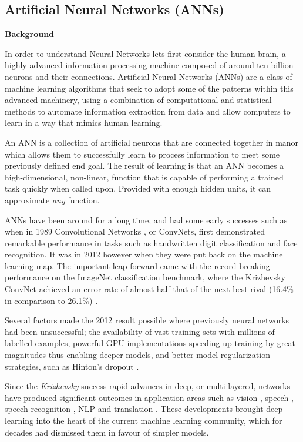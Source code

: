 \documentclass[a4paper,11pt,titlepage]{article}
\begin{document}
	\subsection{Artificial Neural Networks (ANNs)}	
		\textbf{Background} 
		\par
			In order to understand Neural Networks lets first consider the human brain, a highly advanced information processing machine composed of around ten billion neurons and their connections. Artificial Neural Networks (ANNs) are a class of machine learning algorithms that seek to adopt some of the patterns within this advanced machinery, using a combination of computational and statistical methods to automate information extraction from data and allow computers to learn in a way that mimics human learning.
			\par 
			An ANN is a collection of artificial neurons that are connected together in manor which allows them to successfully learn to process information to meet some previously defined end goal. The result of learning is that an ANN becomes a high-dimensional, non-linear, function that is capable of performing a trained task quickly when called upon. Provided with enough hidden units, it can approximate \textit{any} function. 
			\par
			ANNs have been around for a long time, and had some early successes such as when in 1989 Convolutional Networks \cite{LeCun1989}, or ConvNets, first demonstrated remarkable performance in tasks such as handwritten digit classification and face recognition. It was in 2012 however when they were put back on the machine learning map. The important leap forward came with the record breaking performance on the ImageNet classification benchmark, where the Krizhevsky ConvNet achieved an error rate of almost half that of the next best rival (16.4\% in comparison to 26.1\%) \cite{Krizhevsky2012}.
			\par
			Several factors made the 2012 result possible where previously neural networks had been unsuccessful; the availability of vast training sets with millions of labelled examples, powerful GPU implementations speeding up training by great magnitudes thus enabling deeper models, and better model regularization strategies, such as Hinton's dropout \cite{Hinton2012}.
			\par 
			Since the \textit{Krizhevsky} success rapid advances in deep, or multi-layered, networks have produced significant outcomes in application areas such as vision \cite{Russakovsky2015}, speech \cite{Sutskever2014}, speech recognition \cite{Sainath2015}, NLP \cite{Norouzi2014} and  translation \cite{Graves2014}. These developments brought deep learning into the heart of the current machine learning community, which for decades had dismissed them in favour of simpler models.
\\\
\\\	
\end{document}
